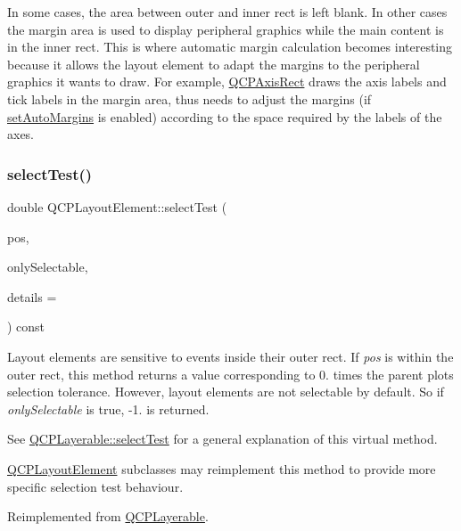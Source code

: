 In some cases, the area between outer and inner rect is left blank. In other cases the margin area is used to display peripheral graphics while the main content is in the inner rect. This is where automatic margin calculation becomes interesting because it allows the layout element to adapt the margins to the peripheral graphics it wants to draw. For example, \mbox{\hyperlink{class_q_c_p_axis_rect}{Q\+C\+P\+Axis\+Rect}} draws the axis labels and tick labels in the margin area, thus needs to adjust the margins (if \mbox{\hyperlink{class_q_c_p_layout_element_accfda49994e3e6d51ed14504abf9d27d}{set\+Auto\+Margins}} is enabled) according to the space required by the labels of the axes. \mbox{\label{class_q_c_p_layout_element_a0b96ae0d7bcfa6e38188fcb1e73e143f}} 
\subsubsection{\texorpdfstring{select\+Test()}{selectTest()}}
{\footnotesize\ttfamily double Q\+C\+P\+Layout\+Element\+::select\+Test (\begin{DoxyParamCaption}\item[{const Q\+PointF \&}]{pos,  }\item[{bool}]{only\+Selectable,  }\item[{Q\+Variant $\ast$}]{details = {} }\end{DoxyParamCaption}) const\hspace{0.3cm}{\ttfamily [virtual]}}

Layout elements are sensitive to events inside their outer rect. If {\itshape pos} is within the outer rect, this method returns a value corresponding to 0. times the parent plot\textquotesingle{}s selection tolerance. However, layout elements are not selectable by default. So if {\itshape only\+Selectable} is true, -\/1. is returned.

See \mbox{\hyperlink{class_q_c_p_layerable_a04db8351fefd44cfdb77958e75c6288e}{Q\+C\+P\+Layerable\+::select\+Test}} for a general explanation of this virtual method.

\mbox{\hyperlink{class_q_c_p_layout_element}{Q\+C\+P\+Layout\+Element}} subclasses may reimplement this method to provide more specific selection test behaviour. 

Reimplemented from \mbox{\hyperlink{class_q_c_p_layerable_a04db8351fefd44cfdb77958e75c6288e}{Q\+C\+P\+Layerable}}.



